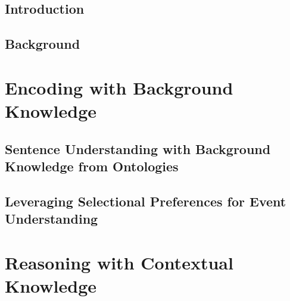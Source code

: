 \documentclass[hidelinks,12pt]{cmuthesis}
\begin{document}
\begin{abstract}
\end{abstract}

% 



\tableofcontents
\listoffigures
\listoftables

\mainmatter


%
%
%
%
%


\chapter{Introduction}
\label{chapter:introduction}

\chapter{Background}
\label{chapter:background}

\part{Encoding with Background Knowledge}
\chapter{Sentence Understanding with Background Knowledge from Ontologies}
\label{chapter:ontolstm}

\chapter{Leveraging Selectional Preferences for Event Understanding}
\label{chapter:nem}

\part{Reasoning with Contextual Knowledge}
\end{document}
